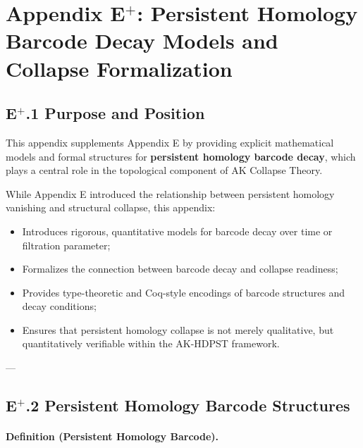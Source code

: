 \documentclass[11pt]{article}
\begin{document}

\section*{Appendix E$^{+}$: Persistent Homology Barcode Decay Models and Collapse Formalization}

\subsection*{E$^{+}$.1 Purpose and Position}

This appendix supplements Appendix E by providing explicit mathematical models and formal structures for \textbf{persistent homology barcode decay}, which plays a central role in the topological component of AK Collapse Theory.

While Appendix E introduced the relationship between persistent homology vanishing and structural collapse, this appendix:

\begin{itemize}
    \item Introduces rigorous, quantitative models for barcode decay over time or filtration parameter;
    \item Formalizes the connection between barcode decay and collapse readiness;
    \item Provides type-theoretic and Coq-style encodings of barcode structures and decay conditions;
    \item Ensures that persistent homology collapse is not merely qualitative, but quantitatively verifiable within the AK-HDPST framework.
\end{itemize}

---

\subsection*{E$^{+}$.2 Persistent Homology Barcode Structures}

\paragraph{Definition (Persistent Homology Barcode).}
\end{document}
